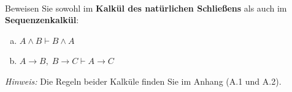 \newcommand{\printpraesenzlsg}{false}
\newcommand{\printloesungen}{true}
\newcommand{\printbewertungen}{false}
\newcommand{\klausurdatum}{}
\newcommand{\klausurdauer}{2 Stunden}
\newcommand{\klausuraufgaben}{7}
\newcommand{\klausurpunkte}{48}

\usepackage{bussproofs}





\\
Beweisen Sie sowohl im \textbf{Kalkül des natürlichen Schließens} als auch im \textbf{Sequenzenkalkül}:
\begin{enumerate}[a)]
  \item $A \wedge B \vdash B \wedge A$
  \item $A \to B,\; B \to C \vdash A \to C$
\end{enumerate}
\textit{Hinweis:} Die Regeln beider Kalküle finden Sie im Anhang (A.1 und A.2).

